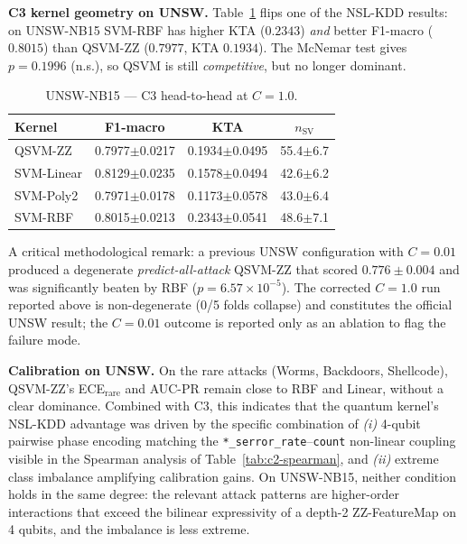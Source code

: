 \documentclass[journal]{IEEEtran}
\newcommand{\ZZ}{\textsc{ZZ}}
\newcommand{\QSVM}{QSVM-\ZZ}
\begin{document}
  \textbf{C3 kernel geometry on UNSW.}
  Table~\ref{tab:c3-unsw} flips one of the NSL-KDD results: on
  UNSW-NB15 SVM-RBF has higher KTA ($0.2343$) \emph{and} better
  F1-macro ($0.8015$) than \QSVM{} ($0.7977$, KTA $0.1934$). The
  McNemar test gives $p{=}0.1996$ (n.s.), so QSVM is still
  \emph{competitive}, but no longer dominant.

  \begin{table}[t]
  \centering
  \caption{UNSW-NB15 --- C3 head-to-head at $C{=}1.0$.}
  \label{tab:c3-unsw}
  \small
  \begin{tabular}{lccc}
  \toprule
  Kernel & F1-macro & KTA & $n_{\text{SV}}$\\\midrule
  QSVM-\ZZ{}   & 0.7977$\pm$0.0217 & 0.1934$\pm$0.0495 & 55.4$\pm$6.7\\
  SVM-Linear   & 0.8129$\pm$0.0235 & 0.1578$\pm$0.0494 & 42.6$\pm$6.2\\
  SVM-Poly2    & 0.7971$\pm$0.0178 & 0.1173$\pm$0.0578 & 43.0$\pm$6.4\\
  SVM-RBF      & 0.8015$\pm$0.0213 & 0.2343$\pm$0.0541 & 48.6$\pm$7.1\\
  \bottomrule
  \end{tabular}
  \end{table}

  A critical methodological remark: a previous UNSW configuration with
  $C{=}0.01$ produced a degenerate \emph{predict-all-attack} \QSVM{}
  that scored $0.776\!\pm\!0.004$ and was significantly beaten by RBF
  ($p{=}6.57\!\times\!10^{-5}$). The corrected $C{=}1.0$ run reported
  above is non-degenerate (0/5 folds collapse) and constitutes the
  official UNSW result; the $C{=}0.01$ outcome is reported only as an
  ablation to flag the failure mode.

  \textbf{Calibration on UNSW.} On the rare attacks (Worms, Backdoors,
  Shellcode), \QSVM{}'s ECE$_{\text{rare}}$ and AUC-PR remain close to
  RBF and Linear, without a clear dominance. Combined with C3, this
  indicates that the quantum kernel's NSL-KDD advantage was driven by
  the specific combination of \emph{(i)} 4-qubit pairwise
  phase encoding matching the \texttt{*\_serror\_rate}--\texttt{count}
  non-linear coupling visible in the Spearman analysis of
  Table~\ref{tab:c2-spearman}, and \emph{(ii)} extreme class
  imbalance amplifying calibration gains.
  On UNSW-NB15, neither condition holds in the same degree: the
  relevant attack patterns are higher-order interactions that exceed
  the bilinear expressivity of a depth-2 \ZZ{}-FeatureMap on 4 qubits,
  and the imbalance is less extreme.
\end{document}

